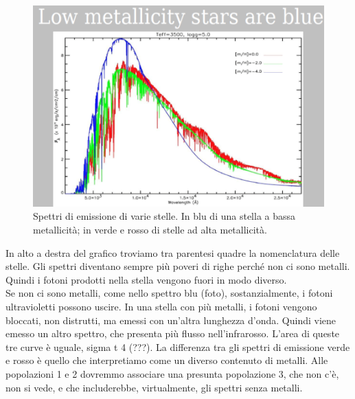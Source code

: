 \documentclass[a4paper,11pt]{article}
\begin{document}
\begin{figure}[h!!]
        \centering
        \includegraphics[width=12cm]{lezione 28 novembre/bassametallicita.png}
        \caption{Spettri di emissione di varie stelle. In blu di una stella a bassa metallicità; in verde e rosso di stelle ad alta metallicità.}
        \label{lezione 28 novembre/bassametallicita.png}
    \end{figure}
In alto a destra del grafico troviamo tra parentesi quadre la nomenclatura delle stelle. Gli spettri diventano sempre più poveri di righe perché non ci sono metalli. Quindi i fotoni prodotti nella stella vengono fuori in modo diverso. \\ Se non ci sono metalli, come nello spettro blu (foto), sostanzialmente, i fotoni ultravioletti possono uscire. In una stella con più metalli, i fotoni vengono bloccati, non distrutti, ma emessi con un'altra lunghezza d'onda. Quindi viene emesso un altro spettro, che presenta più flusso nell'infrarosso. L'area di queste tre curve è uguale, sigma t 4 (???). La differenza tra gli spettri di emissione verde e rosso è quello che interpretiamo come un diverso contenuto di metalli. Alle popolazioni 1 e 2 dovremmo associare una presunta popolazione 3, che non c'è, non si vede, e che includerebbe, virtualmente, gli spettri senza metalli.\\ 
\end{document}
